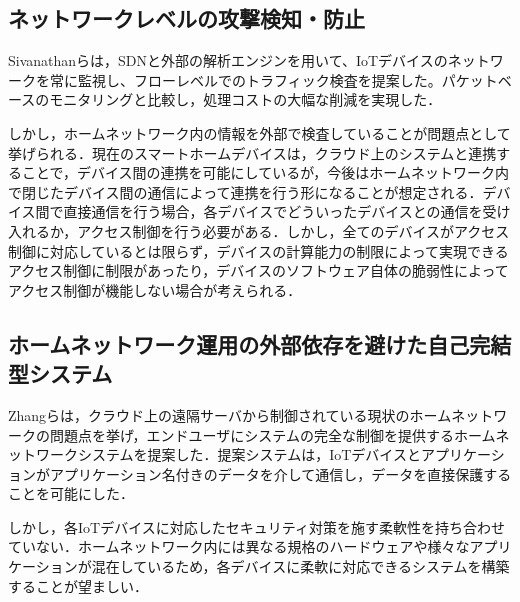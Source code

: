 \documentclass[Japanese]{dicomopapers}
\begin{document}
\subsection{ネットワークレベルの攻撃検知・防止}
Sivanathanらは，SDNと外部の解析エンジンを用いて、IoTデバイスのネットワークを常に監視し、フローレベルでのトラフィック検査を提案した。パケットベースのモニタリングと比較し，処理コストの大幅な削減を実現した．\par
しかし，ホームネットワーク内の情報を外部で検査していることが問題点として挙げられる．現在のスマートホームデバイスは，クラウド上のシステムと連携することで，デバイス間の連携を可能にしているが，今後はホームネットワーク内で閉じたデバイス間の通信によって連携を行う形になることが想定される\cite{d2d}．デバイス間で直接通信を行う場合，各デバイスでどういったデバイスとの通信を受け入れるか，アクセス制御を行う必要がある．しかし，全てのデバイスがアクセス制御に対応しているとは限らず，デバイスの計算能力の制限によって実現できるアクセス制御に制限があったり，デバイスのソフトウェア自体の脆弱性によってアクセス制御が機能しない場合が考えられる\cite{disap}．


\subsection{ホームネットワーク運用の外部依存を避けた自己完結型システム}
Zhangらは，クラウド上の遠隔サーバから制御されている現状のホームネットワークの問題点を挙げ，エンドユーザにシステムの完全な制御を提供するホームネットワークシステムを提案した\cite{sover}．提案システムは，IoTデバイスとアプリケーションがアプリケーション名付きのデータを介して通信し，データを直接保護することを可能にした．\par
しかし，各IoTデバイスに対応したセキュリティ対策を施す柔軟性を持ち合わせていない．ホームネットワーク内には異なる規格のハードウェアや様々なアプリケーションが混在しているため，各デバイスに柔軟に対応できるシステムを構築することが望ましい．
\end{document}
